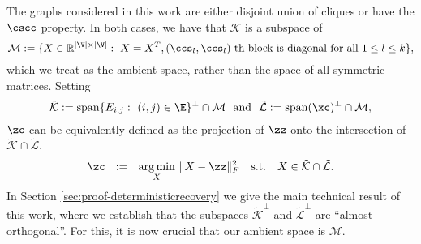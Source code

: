 The  graphs considered in this work  are either disjoint union of cliques or  have the $\cscc$ property.  In both cases, we have that $\mathcal{K}$ is a subspace of  
$$\mathcal{M} := \{ X \in \mathbb{R}^{|\V| \times |\V|}: \ X=X^T, (\ccs_l,\ccs_l) \text{-th block is diagonal for all } 1 \leq l \leq k \},
$$
which we   treat  as the ambient space, rather than the space of all symmetric matrices.
 Setting 
$$   \tilde{\mathcal{K}} :={\rm span}\{E_{i,j}: \ (i,j)\in \E \}^\perp \cap \mathcal{M}  \ \text{ and } \  \tilde{\mathcal{L}}:= {\rm span}(\xc)^\perp\cap \mathcal{M},$$
 $\zc$ can be equivalently defined as the projection of $\zz$ onto the intersection of $\tilde{\mathcal{K}} \cap \tilde{\mathcal{L}}$.
\begin{equation} \label{eq:euclideanprojection}
\zc ~~:=~~ \underset{X}{\arg \min} ~\| X - \zz \|_F^2 \quad \mathrm{s.t.} \quad X \in \tilde{\mathcal{K}} \cap \tilde{\mathcal{L}}.
\end{equation}
 In Section \ref{sec:proof-deterministicrecovery} we give the main technical result of this work, where we establish  that the subspaces $ \tilde{\mathcal{K}}^\perp$ and $ \tilde{\mathcal{L}}^\perp$ are ``almost orthogonal''. For this, it is now crucial that our ambient space is $\mathcal{M}$.


